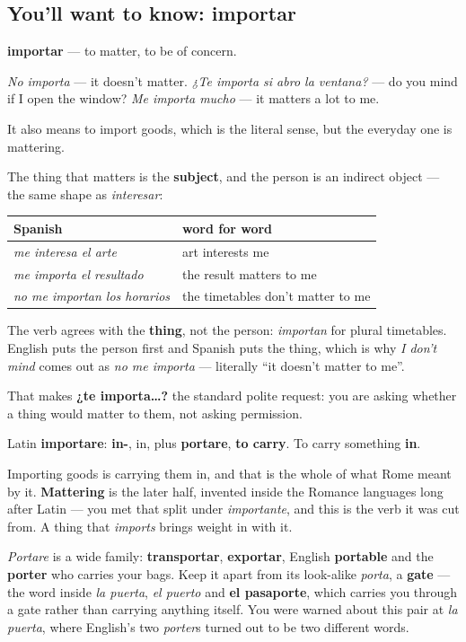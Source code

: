 \subsection*{You'll want to know: importar}
\textbf{importar} — to matter, to be of concern.

\emph{No importa} — it doesn't matter. \emph{¿Te importa si abro la ventana?} — do you mind if I open the window? \emph{Me importa mucho} — it matters a lot to me.

It also means to import goods, which is the literal sense, but the everyday one is mattering.

\begin{grammarlens}[title={Grammar Lens: it works like gustar and interesar}]
The thing that matters is the \textbf{subject}, and the person is an indirect object — the same shape as \emph{interesar}:

\noindent
\begin{tabularx}{\linewidth}{@{}>{\raggedright\arraybackslash}X>{\raggedright\arraybackslash}X@{}}
\toprule
\textbf{Spanish} & \textbf{word for word} \\
\midrule
\emph{me interesa el arte} & art interests me \\
\emph{me importa el resultado} & the result matters to me \\
\emph{no me importan los horarios} & the timetables don't matter to me \\
\bottomrule
\end{tabularx}

The verb agrees with the \textbf{thing}, not the person: \emph{importan} for plural timetables. English puts the person first and Spanish puts the thing, which is why \emph{I don't mind} comes out as \emph{no me importa} — literally \textquotedblleft{}it doesn't matter to me\textquotedblright{}.

That makes \textbf{¿te importa…?} the standard polite request: you are asking whether a thing would matter to them, not asking permission.
\end{grammarlens}

\begin{cousinweb}
Latin \textbf{importare}: \textbf{in-}, in, plus \textbf{portare}, \textbf{to carry}. To carry something \textbf{in}.

Importing goods is carrying them in, and that is the whole of what Rome meant by it. \textbf{Mattering} is the later half, invented inside the Romance languages long after Latin — you met that split under \emph{importante}, and this is the verb it was cut from. A thing that \emph{imports} brings weight in with it.

\emph{Portare} is a wide family: \textbf{transportar}, \textbf{exportar}, English \textbf{portable} and the \textbf{porter} who carries your bags. Keep it apart from its look-alike \emph{porta}, a \textbf{gate} — the word inside \emph{la puerta}, \emph{el puerto} and \textbf{el pasaporte}, which carries you through a gate rather than carrying anything itself. You were warned about this pair at \emph{la puerta}, where English's two \emph{porter}s turned out to be two different words.
\end{cousinweb}

